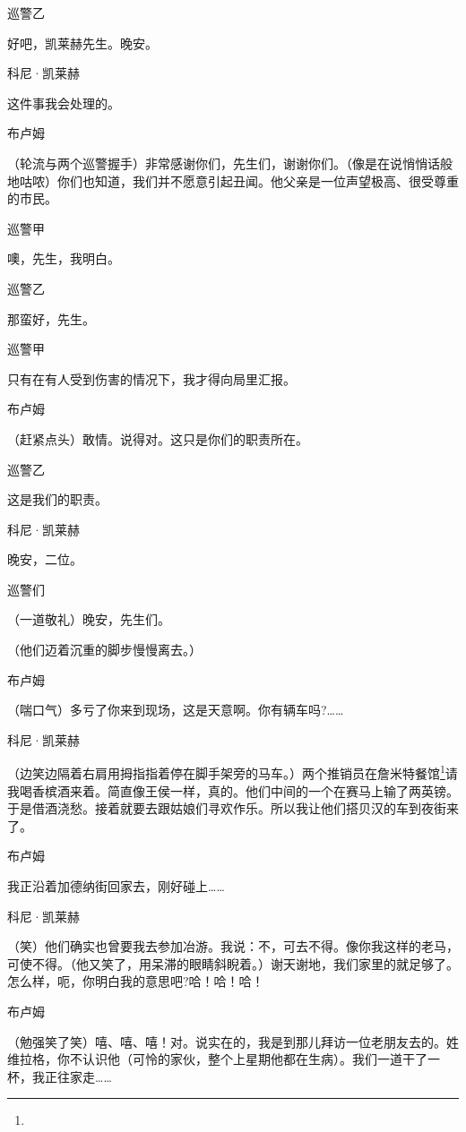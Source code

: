 \par 巡警乙
\par 好吧，凯莱赫先生。晚安。
\par 科尼·凯莱赫
\par 这件事我会处理的。
\par 布卢姆
\par （轮流与两个巡警握手）非常感谢你们，先生们，谢谢你们。（像是在说悄悄话般地咕哝）你们也知道，我们并不愿意引起丑闻。他父亲是一位声望极高、很受尊重的市民。
\par 巡警甲
\par 噢，先生，我明白。
\par 巡警乙
\par 那蛮好，先生。
\par 巡警甲
\par 只有在有人受到伤害的情况下，我才得向局里汇报。
\par 布卢姆
\par （赶紧点头）敢情。说得对。这只是你们的职责所在。
\par 巡警乙
\par 这是我们的职责。
\par 科尼·凯莱赫
\par 晚安，二位。
\par 巡警们
\par （一道敬礼）晚安，先生们。
\par （他们迈着沉重的脚步慢慢离去。）
\par 布卢姆
\par （喘口气）多亏了你来到现场，这是天意啊。你有辆车吗?……
\par 科尼·凯莱赫
\par （边笑边隔着右肩用拇指指着停在脚手架旁的马车。）两个推销员在詹米特餐馆\footnote{}请我喝香槟酒来着。简直像王侯一样，真的。他们中间的一个在赛马上输了两英镑。于是借酒浇愁。接着就要去跟姑娘们寻欢作乐。所以我让他们搭贝汉的车到夜街来了。
\par 布卢姆
\par 我正沿着加德纳街回家去，刚好碰上……
\par 科尼·凯莱赫
\par （笑）他们确实也曾要我去参加冶游。我说：不，可去不得。像你我这样的老马，可使不得。（他又笑了，用呆滞的眼睛斜睨着。）谢天谢地，我们家里的就足够了。怎么样，呃，你明白我的意思吧?哈！哈！哈！
\par 布卢姆
\par （勉强笑了笑）嘻、嘻、嘻！对。说实在的，我是到那儿拜访一位老朋友去的。姓维拉格，你不认识他（可怜的家伙，整个上星期他都在生病）。我们一道干了一杯，我正往家走……
